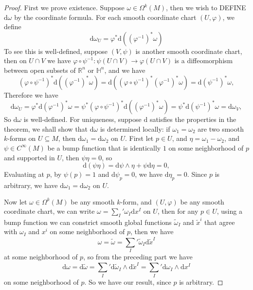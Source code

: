 \documentclass[../main.tex]{subfiles}
\begin{document}
\begin{proof}
  First we prove existence. Suppose $\omega \in \Omega^k(M)$, then we wish to DEFINE $\mathrm{d} \omega$ by the coordinate formula. For each smooth coordinate chart $(U, \varphi)$, we define
  \begin{equation*}
    \mathrm{d} \omega_U = \varphi^* \mathrm{d} ((\varphi^{-1})^* \omega)
  \end{equation*}
  To see this is well-defined, suppose $(V, \psi)$ is another smooth coordinate chart, then on $U \cap V$ we have $\varphi \circ \psi^{-1} : \psi(U \cap V) \to \varphi(U \cap V)$ is a diffeomorphism between open subsets of $\mathbb{R}^n$ or $\mathbb{H}^n$, and we have
  \begin{equation*}
    (\varphi \circ \psi^{-1})^* \mathrm{d} ( (\varphi^{-1})^* \omega) = \mathrm{d} ((\varphi \circ \psi^{-1})^* (\varphi^{-1})^* \omega) = \mathrm{d} (\psi^{-1})^* \omega,
  \end{equation*}
  Therefore we have
  \begin{equation*}
    \mathrm{d} \omega_U = \varphi^* \mathrm{d} (\varphi^{-1})^* \omega = \psi^* (\varphi \circ \psi^{-1})^* \mathrm{d} ( (\varphi^{-1})^* \omega) = \psi^* \mathrm{d} (\psi^{-1})^* \omega = \mathrm{d} \omega_V,
  \end{equation*}
  So $\mathrm{d} \omega$ is well-defined. For uniqueness, suppose $\mathrm{d} $ satisfies the properties in the theorem, we shall show that $\mathrm{d} \omega$ is determined locally: if $\omega_1=\omega_2$ are two smooth $k$-forms on $U \subseteq M$, then $\mathrm{d} \omega_1 = \mathrm{d} \omega_2$ on $U$. First let $p\in U$, and $\eta = \omega_1 - \omega_2$, and $\psi \in C^\infty (M)$ be a bump function that is identically $1$ on some neighborhood of $p$ and supported in $U$, then $\psi \eta = 0$, so
  \begin{equation*}
    \mathrm{d} (\psi \eta) = \mathrm{d} \psi \wedge \eta + \psi \mathrm{d} \eta = 0,
  \end{equation*}
  Evaluating at $p$, by $\psi(p) = 1$ and $\mathrm{d} \psi_p = 0$, we have $\mathrm{d} \eta_p = 0$. Since $p$ is arbitrary, we have $\mathrm{d} \omega_1 = \mathrm{d} \omega_2$ on $U$.

  Now let $\omega \in \Omega^k(M)$ be any smooth $k$-form, and $(U, \varphi)$ be any smooth coordinate chart, we can write $\omega = \sum_I^{}' \omega_I \mathrm{d} x^I$ on $U$, then for any $p\in U$, using a bump function we can constrict smooth global functions $\tilde{\omega}_I$ and $\tilde{x}^i$ that agree with $\omega_I$ and $x^i$ on some neighborhood of $p$, then we have
  \begin{equation*}
    \omega = \tilde{\omega} = \sum_I^{}' \tilde{\omega}_I \mathrm{d} \tilde{x}^I
  \end{equation*}
  at some neighborhood of $p$, so from the preceding part we have
  \begin{equation*}
    \mathrm{d} \omega = \mathrm{d} \tilde{\omega} = \sum_I^{}' \mathrm{d} \tilde{\omega}_I \wedge \mathrm{d} \tilde{x}^I = \sum_I^{}' \mathrm{d} \omega_I \wedge \mathrm{d} x^I
  \end{equation*}
  on some neighborhood of $p$. So we have our result, since $p$ is arbitrary.
\end{proof}
\end{document}
